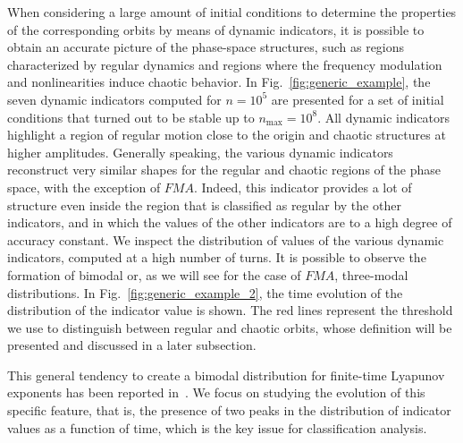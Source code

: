 When considering a large amount of initial conditions to determine the properties of the corresponding orbits by means of dynamic indicators, it is possible to obtain an accurate picture of the phase-space structures, such as regions characterized by regular dynamics and regions where the frequency modulation and nonlinearities induce chaotic behavior. In Fig.~\ref{fig:generic_example}, the seven dynamic indicators computed for $n=10^5$ are presented for a set of initial conditions that turned out to be stable up to $n_\text{max}=10^8$. All dynamic indicators highlight a region of regular motion close to the origin and chaotic structures at higher amplitudes. Generally speaking, the various dynamic indicators reconstruct very similar shapes for the regular and chaotic regions of the phase space, with the exception of $FMA$. Indeed, this indicator provides a lot of structure even inside the region that is classified as regular by the other indicators, and in which the values of the other indicators are to a high degree of accuracy constant. We inspect the distribution of values of the various dynamic indicators, computed at a high number of turns. It is possible to observe the formation of bimodal or, as we will see for the case of $FMA$, three-modal distributions. In Fig.~\ref{fig:generic_example_2}, the time evolution of the distribution of the indicator value is shown. The red lines represent the threshold we use to distinguish between regular and chaotic orbits, whose definition will be presented and discussed in a later subsection.

This general tendency to create a bimodal distribution for finite-time Lyapunov exponents has been reported in~\cite{PhysRevE.60.2761,VALLEJO200326}. We focus on studying the evolution of this specific feature, that is, the presence of two peaks in the distribution of indicator values as a function of time, which is the key issue for classification analysis. 

